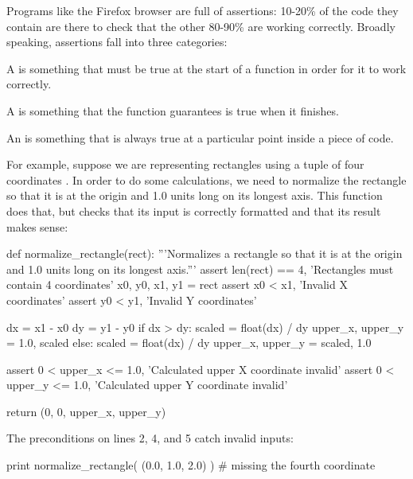 Programs like the Firefox browser are full of assertions: 10-20\% of the
code they contain are there to check that the other 80-90\% are working
correctly. Broadly speaking, assertions fall into three categories:

\begin{swcitemize}
\item
  A  is something that must be
  true at the start of a function in order for it to work correctly.
\item
  A  is something that the
  function guarantees is true when it finishes.
\item
  An  is something that is always true
  at a particular point inside a piece of code.
\end{swcitemize}

For example, suppose we are representing rectangles using a tuple of
four coordinates . In order to do some
calculations, we need to normalize the rectangle so that it is at the
origin and 1.0 units long on its longest axis. This function does that,
but checks that its input is correctly formatted and that its result
makes sense:

\begin{VerbIn}
def normalize_rectangle(rect):
    '''Normalizes a rectangle so that it is at the origin and 1.0 units long on its longest axis.'''
    assert len(rect) == 4, 'Rectangles must contain 4 coordinates'
    x0, y0, x1, y1 = rect
    assert x0 < x1, 'Invalid X coordinates'
    assert y0 < y1, 'Invalid Y coordinates'

    dx = x1 - x0
    dy = y1 - y0
    if dx > dy:
        scaled = float(dx) / dy
        upper_x, upper_y = 1.0, scaled
    else:
        scaled = float(dx) / dy
        upper_x, upper_y = scaled, 1.0

    assert 0 < upper_x <= 1.0, 'Calculated upper X coordinate invalid'
    assert 0 < upper_y <= 1.0, 'Calculated upper Y coordinate invalid'

    return (0, 0, upper_x, upper_y)
\end{VerbIn}

The preconditions on lines 2, 4, and 5 catch invalid inputs:

\begin{VerbIn}
print normalize_rectangle( (0.0, 1.0, 2.0) ) # missing the fourth coordinate
\end{VerbIn}


